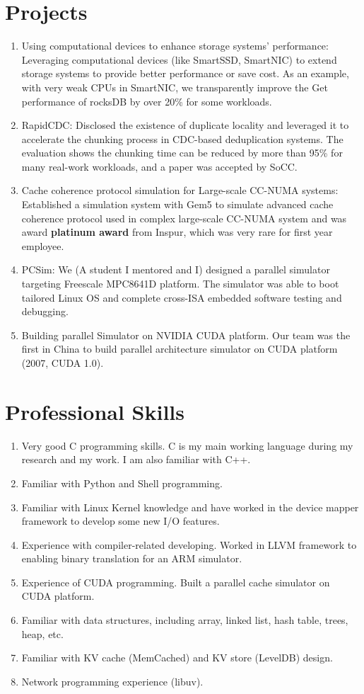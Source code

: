 \documentclass{article}
\begin{document}
\section{Projects}
\small
\begin{enumerate}
\item Using computational devices to enhance storage systems' performance: Leveraging computational devices (like SmartSSD, SmartNIC) to extend storage systems to provide better performance or save cost. As an example, with very weak CPUs in SmartNIC, we transparently improve the Get performance of rocksDB by over 20\% for some workloads.
\item	RapidCDC:  Disclosed the existence of duplicate locality and leveraged it to accelerate the chunking process in CDC-based deduplication systems. The evaluation shows the chunking time can be reduced by more than 95\% for many real-work workloads, and a paper was accepted by SoCC.
\item	Cache coherence protocol simulation for Large-scale CC-NUMA systems: Established a simulation system with Gem5 to simulate advanced cache coherence protocol used in complex large-scale CC-NUMA system and was award \textbf{platinum award} from Inspur, which was very rare for first year employee.
\item	PCSim: We (A student I mentored and I) designed a parallel simulator targeting Freescale MPC8641D platform. The simulator was able to boot tailored Linux OS and complete cross-ISA embedded software testing and debugging.
\item	Building parallel Simulator on NVIDIA CUDA platform. Our team was the first in China to build parallel architecture simulator on CUDA platform (2007, CUDA 1.0). 
\end{enumerate}

\section{Professional Skills}
\begin{enumerate}
\item	Very good C programming skills. C is my main working language during my research and my work. I am also familiar with C++.
\item	Familiar with Python and Shell programming.
\item	Familiar with Linux Kernel knowledge and have worked in the device mapper framework to develop some new I/O features.
\item	Experience with compiler-related developing. Worked in LLVM framework to enabling binary translation for an ARM simulator. 
\item	Experience of CUDA programming. Built a parallel cache simulator on CUDA platform.
\item	Familiar with data structures, including array, linked list, hash table, trees, heap, etc.
\item   Familiar with KV cache (MemCached) and KV store (LevelDB) design.
\item	Network programming experience (libuv).
\end{enumerate}
\end{document}
